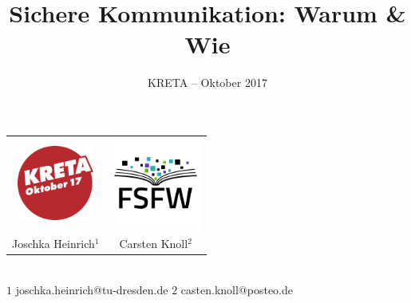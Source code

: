 \documentclass{beamer}
\title{Sichere Kommunikation: Warum \& Wie}
\subtitle{KRETA – Oktober 2017}
\begin{document}
\begin{frame}
  \begin{center}
    \begin{tabularx}{7cm}{cc}
      \includegraphics[width=2.5cm]{img-src/kreta-logo.png}&
      \includegraphics[width=3cm]{img-src/fsfw-logo-with-text.pdf}\\
      Joschka Heinrich${}^{1}$&
      Carsten Knoll${}^{2}$
    \end{tabularx}
    
    \vspace*{2\baselineskip}

    \parbox{.95\columnwidth}{\centering\Large\inserttitle}

    \vspace*{\baselineskip}

    \structure{\large \insertsubtitle}

  \end{center}

  ~\\[5mm]
  {\tiny $1$ joschka.heinrich@tu-dresden.de \qquad $2$ casten.knoll@posteo.de}
\end{frame}


\end{document}
